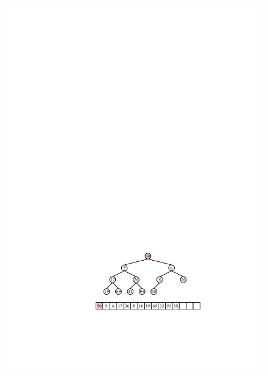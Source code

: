 \begin{figure}
\begin{center}
    \includegraphics[height=\QuarterHeightScaleIfNeeded]{figs/heap-remove-2} \\

\end{center}
\end{figure}
